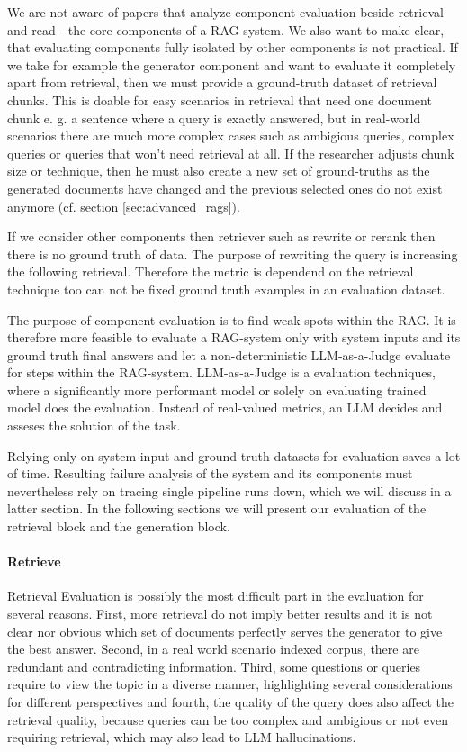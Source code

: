 We are not aware of papers that analyze component evaluation beside retrieval and read - the core components of a RAG system. We also want to make clear, that evaluating components fully isolated by other components is not practical. If we take for example the generator component and want to evaluate it completely apart from retrieval, then we must provide a ground-truth dataset of retrieval chunks. This is doable for easy scenarios in retrieval that need one document chunk e. g. a sentence where a query is exactly answered, but in real-world scenarios there are much more complex cases such as ambigious queries, complex queries or queries that won't need retrieval at all.\cite{Huang.2023} If the researcher adjusts chunk size or technique, then he must also create a new set of ground-truths as the generated documents have changed and the previous selected ones do not exist anymore (cf. section \ref{sec:advanced_rags}). 

If we consider other components then retriever such as rewrite or rerank then there is no ground truth of data. The purpose of rewriting the query is increasing the following retrieval. Therefore the metric is dependend on the retrieval technique too can not be fixed ground truth examples in an evaluation dataset.

The purpose of component evaluation is to find weak spots within the RAG. It is therefore more feasible to evaluate a RAG-system only with system inputs and its ground truth final answers and let a non-deterministic LLM-as-a-Judge evaluate for steps within the RAG-system. LLM-as-a-Judge is a evaluation techniques, where a significantly more performant model or solely on evaluating trained model does the evaluation. Instead of real-valued metrics, an LLM decides and asseses the solution of the task. 

Relying only on system input and ground-truth datasets for evaluation saves a lot of time. Resulting failure analysis of the system and its components must nevertheless rely on tracing single pipeline runs down, which we will discuss in a latter section. In the following sections we will present our evaluation of the retrieval block and the generation block.


\paragraph{Retrieve}
Retrieval Evaluation is possibly the most difficult part in the evaluation for several reasons. First, more retrieval do not imply better results and it is not clear nor obvious which set of documents perfectly serves the generator to give the best answer.\cite{Jin.5222024} Second, in a real world scenario indexed corpus, there are redundant and contradicting information.\cite{Yu.2024} Third, some questions or queries require to view the topic in a diverse manner, highlighting several considerations for different perspectives and fourth, the quality of the query does also affect the retrieval quality, because queries can be too complex and ambigious or not even requiring retrieval, which may also lead to LLM hallucinations.\cite{Huang.2023, Mallen.20.12.2022}

